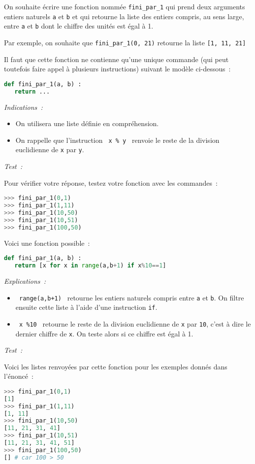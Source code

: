 
On souhaite écrire une fonction  nommée \texttt{fini_par_1}   qui prend deux arguments entiers naturels  \texttt{a} et  \texttt{b} et qui retourne la liste des entiers compris, au sens large, entre \texttt{a} et  \texttt{b} dont le chiffre des unités est égal à 1.
\par
Par exemple, on souhaite que \texttt{fini_par_1(0, 21)} retourne la liste  \texttt{[1, 11, 21]}    
\par
Il faut que cette fonction ne contienne qu'une unique commande (qui peut toutefois faire appel à plusieurs instructions) suivant le modèle ci-dessous~: 
\begin{lstlisting}[language=Python]
def fini_par_1(a, b) :
   return ...
\end{lstlisting}

\medskip
 \textit{Indications~: } 
\begin{itemize}
\item
On utilisera une liste définie en compréhension.
\item
On rappelle que l'instruction \texttt{ x \% y } renvoie le reste de la division euclidienne de  \texttt{x} par  \texttt{y}.    
\end{itemize}

\medskip
  \textit{Test~: } 
\par
Pour vérifier votre réponse, testez votre fonction avec les commandes~: 
\begin{lstlisting}[language=Python]
>>> fini_par_1(0,1)
>>> fini_par_1(1,11)
>>> fini_par_1(10,50)
>>> fini_par_1(10,51)
>>> fini_par_1(100,50)
\end{lstlisting}  

\begin{corrige}
Voici une fonction possible~: 
\par
\begin{lstlisting}[language=Python]
def fini_par_1(a, b) :
   return [x for x in range(a,b+1) if x%10==1]
\end{lstlisting}
\medskip
  \textit{Explications~: } 
\begin{itemize}
\item
 \texttt{  range(a,b+1) } retourne les entiers naturels compris entre  \texttt{a} et  \texttt{b}. On filtre ensuite cette liste à l'aide d'une instruction  \texttt{if}.        
\item
 \texttt{  x \%10 } retourne le reste de la division euclidienne de  \texttt{x}  par  \texttt{10}, c'est à dire le dernier chiffre de  \texttt{x}. On teste alors si ce chiffre est égal à 1.       
\end{itemize}
 \medskip
  \textit{Test~: } 
\par
Voici les listes renvoyées par cette fonction pour les exemples donnés dans l'énoncé~: 
\begin{lstlisting}[language=Python]
>>> fini_par_1(0,1)
[1]
>>> fini_par_1(1,11)
[1, 11]
>>> fini_par_1(10,50)
[11, 21, 31, 41]
>>> fini_par_1(10,51)
[11, 21, 31, 41, 51]
>>> fini_par_1(100,50)
[] # car 100 > 50
\end{lstlisting}  
\end{corrige} 
